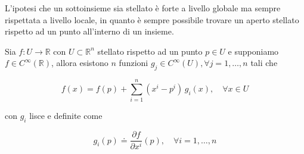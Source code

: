 L'ipotesi che un sottoinsieme sia stellato è forte a livello globale ma sempre rispettata a livello locale, in quanto è sempre possibile trovare un aperto stellato rispetto ad un punto all'interno di un insieme.

\begin{theorem}
	Sia $ f : U \to \mathbb{R} $ con $ U \subset \mathbb{R}^{n} $ stellato rispetto ad un punto $ p \in U $ e supponiamo $ f \in C^{\infty}(\mathbb{R}) $, allora esistono $ n $ funzioni $ g_{j} \in C^{\infty}(U), \forall j = 1,\dots,n $ tali che
	
	\begin{equation}
		f(x) = f(p) + \sum_{i=1}^{n} (x^{i}-p^{i}) \, g_{i}(x), \quad \forall x \in U
	\end{equation}
	
	con $ g_{i} $ lisce e definite come
	
	\begin{equation}
		g_{i}(p) \doteq \dfrac{\partial f}{\partial x^{i}} (p), \quad \forall i=1,\dots,n
	\end{equation}
\end{theorem}

